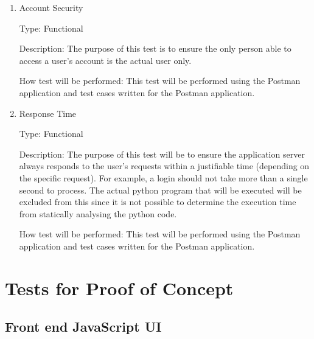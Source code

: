 \documentclass[12pt, titlepage]{article}
\begin{document}
\begin{enumerate}

\item{Account Security\\}

Type: Functional

Description: The purpose of this test is to ensure the only person able to
access a user's account is the actual user only.

How test will be performed: This test will be performed using the Postman
application and test cases written for the Postman application.
					
\item{Response Time\\}

Type: Functional

Description: The purpose of this test will be to ensure the application server
always responds to the user's requests within a justifiable time (depending on
the specific request).  For example, a login should not take more than a single
second to process. The actual python program that will be executed will be
excluded from this since it is not possible to determine the execution time
from statically analysing the python code.

How test will be performed: This test will be performed using the Postman
application and test cases written for the Postman application.

\end{enumerate}

\section{Tests for Proof of Concept}

\subsection{Front end JavaScript UI}
		
\end{document}
